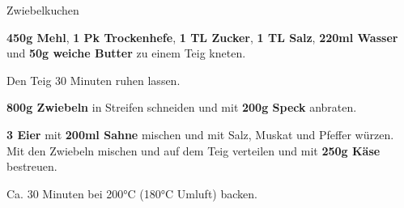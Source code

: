 \begin{recipe}[]{Zwiebelkuchen} %


\step
\textbf{450g Mehl}, \textbf{1 Pk Trockenhefe}, \textbf{1 TL Zucker}, \textbf{1 TL Salz}, \textbf{220ml Wasser} und \textbf{50g weiche Butter} zu einem Teig kneten.

\step
Den Teig 30 Minuten ruhen lassen. 

\step
\textbf{800g Zwiebeln} in Streifen schneiden und mit \textbf{200g Speck} anbraten.

\step
\textbf{3 Eier} mit \textbf{200ml Sahne} mischen und mit Salz, Muskat und Pfeffer würzen. Mit den Zwiebeln mischen und auf dem Teig verteilen und mit \textbf{250g Käse} bestreuen.

\step 
Ca. 30 Minuten bei 200°C (180°C Umluft) backen.

\end{recipe}